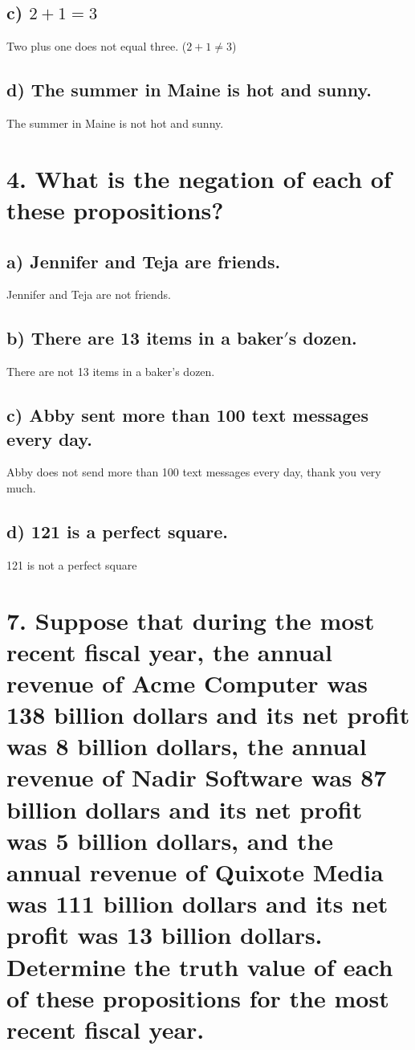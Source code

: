 \documentclass[11pt, oneside]{article} %
\numberwithin{equation}{section} %
\numberwithin{figure}{section} %
\begin{document}
\subsection{c) $2 + 1 = 3$}
Two plus one does not equal three. ($2 + 1 \neq 3$)
\subsection{d) The summer in Maine is hot and sunny.}
The summer in Maine is not hot and sunny.


\section{4. What is the negation of each of these propositions?}
\subsection{a) Jennifer and Teja are friends.}
Jennifer and Teja are not friends.
\subsection{b) There are 13 items in a baker$'$s dozen.}
There are not 13 items in a baker's dozen.
\subsection{c) Abby sent more than 100 text messages every day.}
Abby does not send more than 100 text messages every day, thank you very much.
\subsection{d) 121 is a perfect square.}
121 is not a perfect square


\section{7. Suppose that during the most recent fiscal year, the annual revenue of Acme Computer was 138 billion dollars and its net profit was 8 billion dollars, the annual revenue of Nadir Software was 87 billion dollars and its net profit was 5 billion dollars, and the annual revenue of Quixote Media was 111 billion dollars and its net profit was 13 billion dollars.\\
Determine the truth value of each of these propositions for the most recent fiscal year.}
\end{document}
